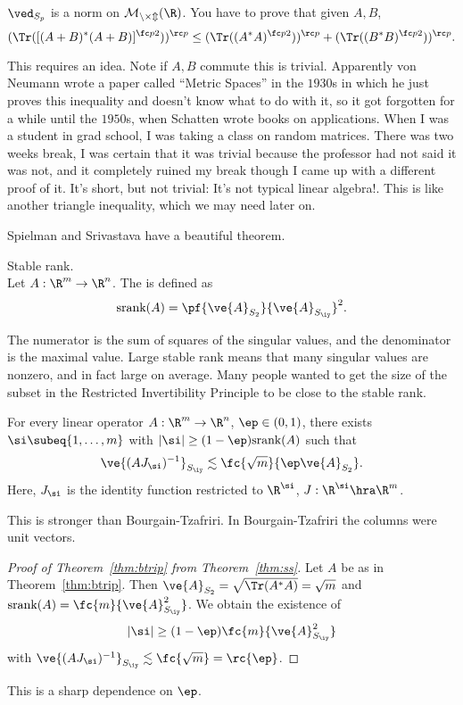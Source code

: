 \begin{exr}
$\ved_{S_p}$ is a norm on $\cal M_{n\times m}(\R)$. You have to prove that given $A,B$,
\[
(\Tr([(A+B)^*(A+B)]^{\fc p2}))^{\rc p}
\le
(\Tr((A^*A)^{\fc p2}))^{\rc p}+(\Tr((B^*B)^{\fc p2}))^{\rc p}.
\]
\end{exr}
This requires an idea. Note if $A,B$ commute this is trivial. 
Apparently von Neumann wrote a paper called ``Metric Spaces'' in the $1930$s in which he just proves this inequality and doesn't know what to do with it, so it got forgotten for a while until the $1950$s, when Schatten wrote books on applications. When I was a student in grad school, I was taking a class on random matrices. There was two weeks break, I was certain that it was trivial because the professor had not said it was not, and it completely ruined my break though I came up with a different proof of it. It's short, but not trivial: It's not typical linear algebra!. This is like another triangle inequality, which we may need later on.


Spielman and Srivastava have a beautiful theorem. %
\begin{df} Stable rank. \\
Let $A:\R^m \to \R^n$. 
The  is defined as
\[
\text{srank}(A)=\pf{\ve{A}_{S_2}}{\ve{A}_{S_\iy}}^2.
\]
\end{df}
The numerator is the sum of squares of the singular values, and the denominator is the maximal value. Large stable rank means that many singular values are nonzero, and in fact large on average. Many people wanted to get the size of the subset in the Restricted Invertibility Principle  
to be close to the stable rank.


\begin{thm}
For every linear operator $A:\R^m\to \R^n$, $\ep\in (0,1)$, 
there exists $\si\subeq \{1,\ldots, m\}$ with $|\si|\ge (1-\ep)\text{srank}(A)$ such that
\[
\ve{(AJ_\si)^{-1}}_{S_{\iy}} \lesssim \fc{\sqrt m}{\ep\ve{A}_{S_2}}.
\]
Here, $J_\si$ is the identity function restricted to $\R^{\si}$,  $J:\R^{\si}\hra \R^m$. 
\end{thm}
This is stronger than Bourgain-Tzafriri. In Bourgain-Tzafriri the columns were unit vectors. 
\begin{proof}[Proof of Theorem~\ref{thm:btrip} from Theorem~\ref{thm:ss}]
Let $A$ be as in Theorem~\ref{thm:btrip}. Then $\ve{A}_{S_2}=\sqrt{\Tr(A^*A)}=\sqrt m$ and $\text{srank}(A)=\fc{m}{\ve{A}^2_{S_{\iy}}}$. We obtain the existence of 
\[
|\si|\ge (1-\ep)\fc{m}{\ve{A}^2_{S_{\iy}}}
\]
with $\ve{(AJ_{\si})^{-1}}_{S_{\iy}}\lesssim \fc{\sqrt m}=\rc{\ep}$.
\end{proof}
This is a sharp dependence on $\ep$.

